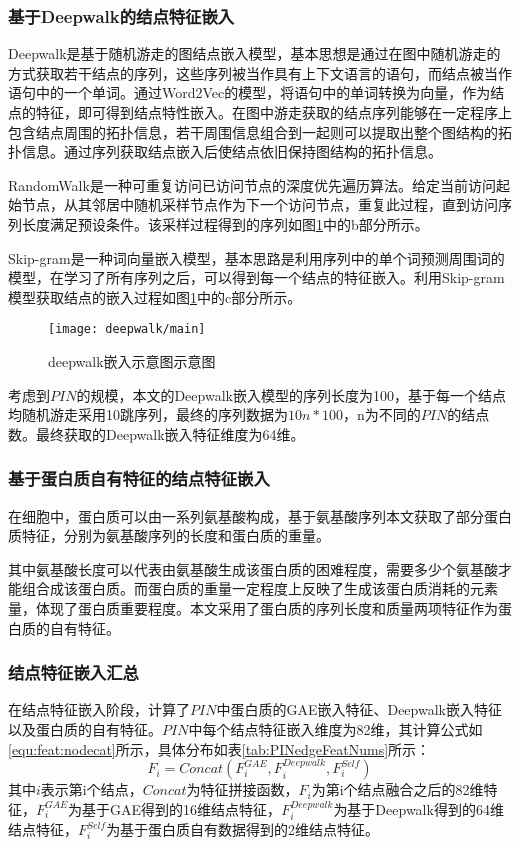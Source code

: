 \subsubsection{基于Deepwalk的结点特征嵌入}

Deepwalk是基于随机游走的图结点嵌入模型，基本思想是通过在图中随机游走的方式获取若干结点的序列，这些序列被当作具有上下文语言的语句，而结点被当作语句中的一个单词。通过Word2Vec的模型，将语句中的单词转换为向量，作为结点的特征，即可得到结点特性嵌入。在图中游走获取的结点序列能够在一定程序上包含结点周围的拓扑信息，若干周围信息组合到一起则可以提取出整个图结构的拓扑信息。通过序列获取结点嵌入后使结点依旧保持图结构的拓扑信息。

RandomWalk是一种可重复访问已访问节点的深度优先遍历算法。给定当前访问起始节点，从其邻居中随机采样节点作为下一个访问节点，重复此过程，直到访问序列长度满足预设条件。该采样过程得到的序列如图\ref{fig:deepwalk/main}中的b部分所示。

Skip-gram是一种词向量嵌入模型，基本思路是利用序列中的单个词预测周围词的模型，在学习了所有序列之后，可以得到每一个结点的特征嵌入。利用Skip-gram模型获取结点的嵌入过程如图\ref{fig:deepwalk/main}中的c部分所示。

\begin{figure}[htbp]
    \centering
    \texttt{[image: deepwalk/main]}
    \caption{deepwalk嵌入示意图示意图}
    \label{fig:deepwalk/main}
\end{figure}

考虑到$PIN$的规模，本文的Deepwalk嵌入模型的序列长度为100，基于每一个结点均随机游走采用10跳序列，最终的序列数据为$10n*100$，n为不同的$PIN$的结点数。最终获取的Deepwalk嵌入特征维度为64维。

\subsubsection{基于蛋白质自有特征的结点特征嵌入}

在细胞中，蛋白质可以由一系列氨基酸构成，基于氨基酸序列本文获取了部分蛋白质特征，分别为氨基酸序列的长度和蛋白质的重量。

其中氨基酸长度可以代表由氨基酸生成该蛋白质的困难程度，需要多少个氨基酸才能组合成该蛋白质。而蛋白质的重量一定程度上反映了生成该蛋白质消耗的元素量，体现了蛋白质重要程度。本文采用了蛋白质的序列长度和质量两项特征作为蛋白质的自有特征。

\subsubsection{结点特征嵌入汇总}
在结点特征嵌入阶段，计算了$PIN$中蛋白质的GAE嵌入特征、Deepwalk嵌入特征以及蛋白质的自有特征。$PIN$中每个结点特征嵌入维度为82维，其计算公式如\ref{equ:feat:nodecat}所示，具体分布如表\ref{tab:PINedgeFeatNums}所示：
\begin{equation}
    \label{equ:feat:nodecat}
    F_i=Concat(F_i^{GAE},F_i^{Deepwalk},F_i^{Self})
\end{equation}
其中$i$表示第i个结点，$Concat$为特征拼接函数，$F_i$为第i个结点融合之后的82维特征，$F_i^{GAE}$为基于GAE得到的16维结点特征，$F_i^{Deepwalk}$为基于Deepwalk得到的64维结点特征，$F_i^{Self}$为基于蛋白质自有数据得到的2维结点特征。


